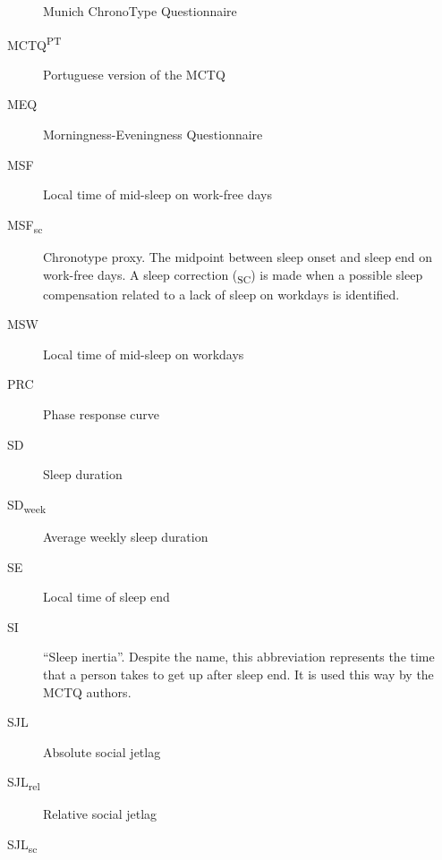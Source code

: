 \begin{siglas}
\begin{description}
Munich ChronoType Questionnaire
\item[MCTQ\textsuperscript{PT}]
\hspace{20cm}

Portuguese version of the MCTQ
\item[MEQ]
\hspace{20cm}

Morningness-Eveningness Questionnaire
\item[MSF]
\hspace{20cm}

Local time of mid-sleep on work-free days
\item[MSF\textsubscript{sc}]
\hspace{20cm}

Chronotype proxy. The midpoint between sleep onset and sleep end on
work-free days. A sleep correction (\textsubscript{SC}) is made when a
possible sleep compensation related to a lack of sleep on workdays is
identified.
\item[MSW]
\hspace{20cm}

Local time of mid-sleep on workdays
\item[PRC]
\hspace{20cm}

Phase response curve
\item[SD]
\hspace{20cm}

Sleep duration
\item[SD\textsubscript{week}]
\hspace{20cm}

Average weekly sleep duration
\item[SE]
\hspace{20cm}

Local time of sleep end
\item[SI]
\hspace{20cm}

``Sleep inertia''. Despite the name, this abbreviation represents the
time that a person takes to get up after sleep end. It is used this way
by the MCTQ authors.
\item[SJL]
\hspace{20cm}

Absolute social jetlag
\item[SJL\textsubscript{rel}]
\hspace{20cm}

Relative social jetlag
\item[SJL\textsubscript{sc}]
\hspace{20cm}


\end{description}
\end{siglas}
